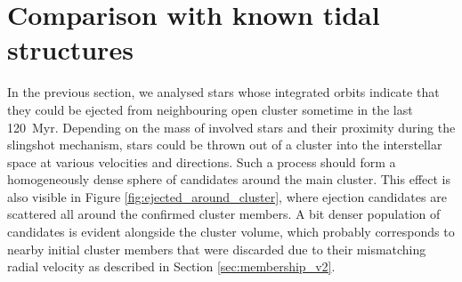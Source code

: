 \section{Comparison with known tidal structures}
\label{sec:tails_chem}
In the previous section, we analysed stars whose integrated orbits indicate that they could be ejected from neighbouring open cluster sometime in the last 120~Myr. Depending on the mass of involved stars and their proximity during the slingshot mechanism, stars could be thrown out of a cluster into the interstellar space at various velocities and directions. Such a process should form a homogeneously dense sphere of candidates around the main cluster. This effect is also visible in Figure \ref{fig:ejected_around_cluster}, where ejection candidates are scattered all around the confirmed cluster members. A bit denser population of candidates is evident alongside the cluster volume, which probably corresponds to nearby initial cluster members that were discarded due to their mismatching radial velocity as described in Section   \ref{sec:membership_v2}.

